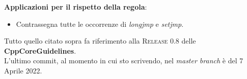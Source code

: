 \textsf{\small \textbf{Applicazioni per il rispetto della regola}: }

\begin{itemize}
	\item \textsf{\small Contrassegna tutte le occorrenze di \emph{longjmp} e \emph{setjmp}.}
\end{itemize}

\break

\fleuron

\textsf{\small Tutto quello citato sopra fa riferimento alla \textsc{Release 0.8} delle \textbf{CppCoreGuidelines}.} \\
\textsf{\small L'ultimo commit, al momento in cui sto scrivendo, nel \emph{master branch} è del 7 Aprile 2022.} \\ %

